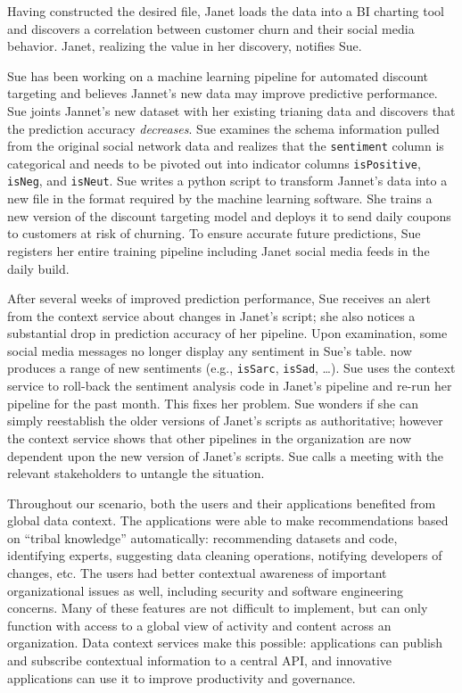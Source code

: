 \documentclass{sig-alternate}
\begin{document}
Having constructed the desired file, Janet loads the data into a BI charting tool and discovers a correlation between customer churn and their social media behavior. 
Janet, realizing the value in her discovery, notifies Sue.


Sue has been working on a machine learning pipeline for automated discount targeting and believes Jannet's new data may improve predictive performance.
Sue joints Jannet's new dataset with her existing trianing data and discovers that the prediction accuracy \emph{decreases}.  
Sue examines the schema information pulled from the original social network data and realizes that the \verb|sentiment| column is categorical and needs to be pivoted out into indicator columns \verb|isPositive|, \verb|isNeg|, and \verb|isNeut|. 
Sue writes a python script to transform Jannet's data into a new file in the format required by the machine learning software.
She trains a new version of the discount targeting model and deploys it to send daily coupons to customers at risk of churning.
To ensure accurate future predictions, Sue registers her entire training pipeline including Janet social media feeds in the daily build.

After several weeks of improved prediction performance, Sue receives an alert from the context service about changes in Janet's script; she also notices  a substantial drop in prediction accuracy of her pipeline. 
Upon examination, some social media messages no longer display any sentiment in Sue's table.  now produces a range of new sentiments (e.g., \verb|isSarc|, \verb|isSad|, \ldots).
Sue uses the context service to roll-back the sentiment analysis code in Janet's pipeline and re-run her pipeline for the past month.  
This fixes her problem. 
Sue wonders if she can simply reestablish the older versions of Janet's scripts as authoritative; however the context service shows that other pipelines in the organization are now dependent upon the new version of Janet's scripts.  Sue calls a meeting with the relevant stakeholders to untangle the situation.


Throughout our scenario, both the users and their applications benefited from global data context. 
The applications were able to make recommendations based on ``tribal knowledge'' automatically: recommending datasets and code, identifying experts, suggesting data cleaning operations, notifying developers of changes, etc. 
The users had better contextual awareness of important organizational issues as well, including security and software engineering concerns. 
Many of these features are not difficult to implement, but can only function with access to a global view of activity and content across an organization. 
Data context services make this possible: applications can publish and subscribe contextual information to a central API, and innovative applications can use it to improve productivity and governance.
\end{document}
